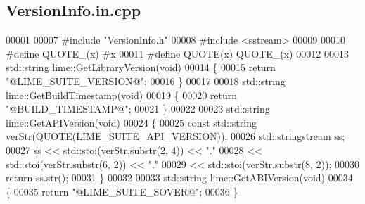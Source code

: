 \subsection{Version\+Info.\+in.\+cpp}
\label{VersionInfo_8in_8cpp_source}

\begin{DoxyCode}
00001 
00007 \textcolor{preprocessor}{#include "VersionInfo.h"}
00008 \textcolor{preprocessor}{#include <sstream>}
00009 
00010 \textcolor{preprocessor}{#define QUOTE\_(x) #x}
00011 \textcolor{preprocessor}{#define QUOTE(x) QUOTE\_(x)}
00012 
00013 std::string lime::GetLibraryVersion(\textcolor{keywordtype}{void})
00014 \{
00015     \textcolor{keywordflow}{return} \textcolor{stringliteral}{"@LIME\_SUITE\_VERSION@"};
00016 \}
00017 
00018 std::string lime::GetBuildTimestamp(\textcolor{keywordtype}{void})
00019 \{
00020     \textcolor{keywordflow}{return} \textcolor{stringliteral}{"@BUILD\_TIMESTAMP@"};
00021 \}
00022 
00023 std::string lime::GetAPIVersion(\textcolor{keywordtype}{void})
00024 \{
00025     \textcolor{keyword}{const} std::string verStr(QUOTE(LIME_SUITE_API_VERSION));
00026     std::stringstream ss;
00027     ss << std::stoi(verStr.substr(2, 4)) << \textcolor{stringliteral}{"."}
00028        << std::stoi(verStr.substr(6, 2)) << \textcolor{stringliteral}{"."}
00029        << std::stoi(verStr.substr(8, 2));
00030     \textcolor{keywordflow}{return} ss.str();
00031 \}
00032 
00033 std::string lime::GetABIVersion(\textcolor{keywordtype}{void})
00034 \{
00035     \textcolor{keywordflow}{return} \textcolor{stringliteral}{"@LIME\_SUITE\_SOVER@"};
00036 \}
\end{DoxyCode}
